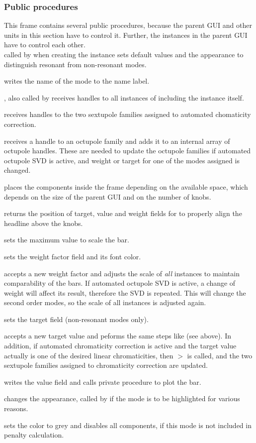 \documentclass[12pt]{article}
\newcommand\code[1]{{\tt #1}}
\newcommand\guifco[1]{{\color{violet}\code{#1}}}
\newcommand{\unico}[1]{{\color{burntorange}\code{#1}}}
\newcommand{\prcod}[2]{\opauni{#1}$>$\unico{#2}}
\newcommand{\opagui}[1]{\colorbox{blue!20}{{\color{black}\code{#1}}}}
\newcommand{\ogui}[1]{\hyperref[#1]{\opagui{#1}}}
\newcommand{\opaguif}[1]{\colorbox{violet!30}{{\color{black}\code{#1}}}}
\newcommand{\oguif}[1]{\hyperref[#1]{\opaguif{#1}}}
\newcommand{\opauni}[1]{\colorbox{orange!30}{{\color{black}\code{#1}}}}
\newcommand{\ppro}[1]{\subsubsection*{Public procedures} #1}
\begin{document}
\ppro{
This frame contains several public procedures, because the parent GUI \ogui{opachroma} and other units in this section have to control it. Further, the instances in the parent GUI have to control each other.\\

\guifco{Init} called by \ogui{opachroma} when creating the instance sets default values and the appearance to distinguish resonant from non-resonant modes.

\guifco{SetLab} writes the name of the mode to the name label.

\guifco{Brothers}, also called by \ogui{opachroma} receives handles to all instances of \oguif{chamframe} including the instance itself.

\guifco{getChromSexHandles} receives handles to the two sextupole families assigned to automated chomaticity correction.

\guifco{passOctupoleHandle} receives a handle to an octupole family and adds it to an internal array of octupole handles. These are needed to update the octupole families if automated octupole SVD is active, and weight or target for one of the modes assigned is changed.

\guifco{SetSize} places the components inside the frame depending on the available space, which depends on the size of the parent GUI and on the number of knobs.

\guifco{getTabs} returns the position of target, value and weight fields for \ogui{opachroma} to properly align the headline above the knobs.

\guifco{SetValmax} sets the maximum value to scale the bar. 

\guifco{SetWeight} sets the weight factor field and its font color.

\guifco{UpdateWeight} accepts a new weight factor and adjusts the scale of {\em all} \oguif{chamframe} instances to maintain comparability of the bars. 
If automated octupole SVD is active, a change of weight will affect its result, therefore the SVD is repeated. This will change the second order modes, so the scale of all instances is adjusted again.

\guifco{SetTarget} sets the target field (non-resonant modes only).

\guifco{UpdateTarget} accepts a new target value and peforms the same steps like \guifco{UpdateWeight} (see above). In addition, if automated chromaticity correction is active and the target value actually is one of the desired linear chromaticities, then \prcod{chromlib}{ChromCorrect} is called, and the two sextupole families assigned to chromaticity correction are updated.

\guifco{UpdateHam} writes the value field and calls private procedure \guifco{PlotBar} to plot the bar.

\guifco{mySetColor} changes the appearance, called by \ogui{opachroma} if the mode is to be highlighted for various reasons.

\guifco{MinInclude} sets the color to grey and disables all components, if this mode is not included in penalty calculation.
}
\end{document}
